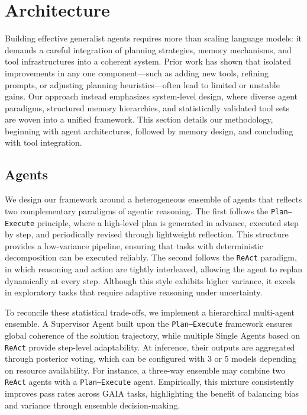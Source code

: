 \section{Architecture}
\label{sec:method}
Building effective generalist agents requires more than scaling language models: it demands a careful integration of planning strategies, memory mechanisms, and tool infrastructures into a coherent system. Prior work has shown that isolated improvements in any one component—such as adding new tools, refining prompts, or adjusting planning heuristics—often lead to limited or unstable gains. Our approach instead emphasizes system-level design, where diverse agent paradigms, structured memory hierarchies, and statistically validated tool sets are woven into a unified framework. This section details our methodology, beginning with agent architectures, followed by memory design, and concluding with tool integration.

\subsection{Agents}
We design our framework around a heterogeneous ensemble of agents that reflects two complementary paradigms of agentic reasoning. The first follows the \texttt{Plan–Execute} principle, where a high-level plan is generated in advance, executed step by step, and periodically revised through lightweight reflection. This structure provides a low-variance pipeline, ensuring that tasks with deterministic decomposition can be executed reliably. The second follows the \texttt{ReAct} paradigm, in which reasoning and action are tightly interleaved, allowing the agent to replan dynamically at every step. Although this style exhibits higher variance, it excels in exploratory tasks that require adaptive reasoning under uncertainty.

To reconcile these statistical trade-offs, we implement a hierarchical multi-agent ensemble. A Supervisor Agent built upon the \texttt{Plan–Execute} framework ensures global coherence of the solution trajectory, while multiple Single Agents based on \texttt{ReAct} provide step-level adaptability. At inference, their outputs are aggregated through posterior voting, which can be configured with 3 or 5 models depending on resource availability. For instance, a three-way ensemble may combine two \texttt{ReAct} agents with a \texttt{Plan–Execute} agent. Empirically, this mixture consistently improves pass rates across GAIA tasks, highlighting the benefit of balancing bias and variance through ensemble decision-making.

